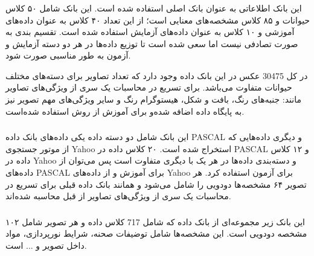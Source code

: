 \subsubsection{}

این بانک اطلاعاتی به عنوان بانک اصلی استفاده شده است. این بانک شامل ۵۰ کلاس حیوانات و ۸۵ کلاس مشخصه‌های معنایی است؛ از این تعداد ۴۰ کلاس به عنوان داده‌های آموزشی و ۱۰ کلاس به عنوان داده‌های آزمایش استفاده شده است. تقسیم بندی به صورت تصادفی نیست اما سعی شده است تا توزیع داده‌ها در هر دو دسته آزمایش و آزمون به طور مناسبی صورت شود.

در کل 30475 عکس در این بانک داده وجود دارد که تعداد تصاویر برای دسته‌های مختلف حیوانات متفاوت می‌باشد. برای تسریع در محاسبات یک سری از ویژگی‌های تصاویر مانند: جنبه‌های رنگ، بافت و شکل، هیستوگرام رنگ و سایر ویژگی‌های مهم تصویر نیز به پایگاه داده اضافه شده‌و برای آموزش از روش
استفاده شده‌است.

\subsubsection{}

این بانک شامل دو دسته داده یکی داده‌های بانک داده PASCAL و دیگری داده‌هایی که از موتور جستجوی Yahoo استخراج شده است. ۲۰ کلاس داده در PASCAL و ۱۲ کلاس داده در Yahoo و دسته‌بندی داده‌ها در هر یک با دیگری متفاوت است پس می‌توان از داده‌های PASCAL برای آموزش و از داده‌های Yahoo برای آزمون استفاده کرد. هر تصویر ۶۴ مشخصه‌ها دودویی را شامل ‌می‌شود و همانند بانک داده قبلی برای تسریع در محاسبات یک سری از ویژگی‌های تصاویر از قبل محاسبه شده‌اند.

\subsubsection{}

این بانک زیر مجموعه‌ای از بانک داده‌
که شامل 717 کلاس داده و هر تصویر شامل ۱۰۲ مشخصه‌ دودویی است. این مشخصه‌ها شامل توضیفات صحنه، شرایط نورپردازی، مواد داخل تصویر و ... است.

